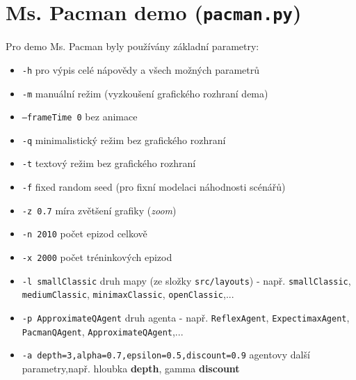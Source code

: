 \section{Ms. Pacman demo (\texttt{pacman.py})}
\label{priloha:manualp}
Pro demo Ms. Pacman byly používány základní parametry:
\begin{itemize}
\item \texttt{-h} pro výpis celé nápovědy a všech možných parametrů
\item \texttt{-m} manuální režim (vyzkoušení grafického rozhraní dema)
\item \texttt{--frameTime 0} bez animace
\item \texttt{-q} minimalistický režim bez grafického rozhraní
\item \texttt{-t} textový režim bez grafického rozhraní 
\item \texttt{-f} fixed random seed (pro fixní modelaci náhodnosti scénářů)
\item \texttt{-z 0.7} míra zvětšení grafiky (\textit{zoom})
\item \texttt{-n 2010} počet epizod celkově
\item \texttt{-x 2000} počet tréninkových epizod
\item \texttt{-l smallClassic} druh mapy (ze složky \texttt{src/layouts}) - např. \texttt{smallClassic}, \newline \texttt{mediumClassic}, \texttt{minimaxClassic}, \texttt{openClassic},...
\item \texttt{-p ApproximateQAgent} druh agenta - např. \texttt{ReflexAgent}, \texttt{ExpectimaxAgent}, \newline \texttt{PacmanQAgent}, \texttt{ApproximateQAgent},...
\item \texttt{-a depth=3,alpha=0.7,epsilon=0.5,discount=0.9} agentovy další parametry,\newline např. hloubka \textbf{depth}, gamma \textbf{discount}
\end{itemize}
